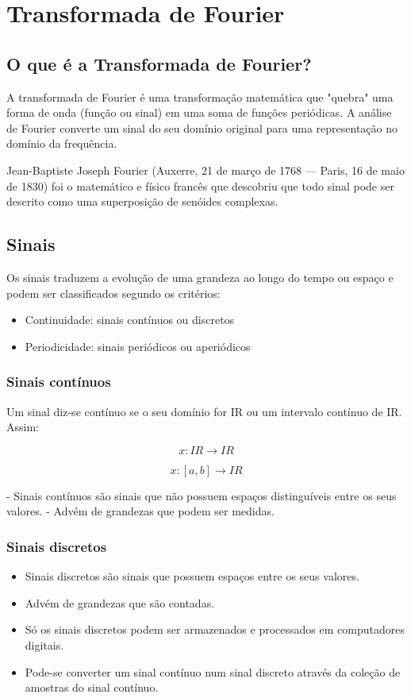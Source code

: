 \section{Transformada de Fourier}

\subsection{O que é a Transformada de Fourier?}

A transformada de Fourier é uma transformação matemática que "quebra" uma forma de onda (função ou sinal) em uma soma de funções periódicas. A análise de Fourier converte um sinal do seu domínio original para uma representação no domínio da frequência.

Jean-Baptiste Joseph Fourier (Auxerre, 21 de março de 1768 — Paris, 16 de maio de 1830) foi o matemático e físico francês que descobriu que todo sinal pode ser descrito como uma superposição de senóides complexas.

\subsection{Sinais}
Os sinais traduzem a evolução de uma grandeza ao longo do tempo ou espaço e podem ser classificados segundo os critérios:

\begin{itemize}
\item Continuidade: sinais contínuos ou discretos
\item Periodicidade: sinais periódicos ou aperiódicos 
\end{itemize}

\subsubsection{Sinais contínuos}

Um sinal diz-se contínuo se o seu domínio for IR ou um intervalo contínuo de IR. Assim:

\[ x: IR \rightarrow IR \]

\[ x: [a,b] \rightarrow IR \]

- Sinais contínuos são sinais que não possuem espaços distinguíveis entre os seus valores.
- Advém de grandezas que podem ser medidas.

\subsubsection{Sinais discretos}
\begin{itemize}
\item Sinais discretos são sinais que possuem espaços entre os seus valores.
\item Advém de grandezas que são contadas.
\item Só os sinais discretos podem ser armazenados e processados em computadores digitais.
\item Pode-se converter um sinal contínuo num sinal discreto através da coleção de amostras do sinal contínuo.
\end{itemize}

